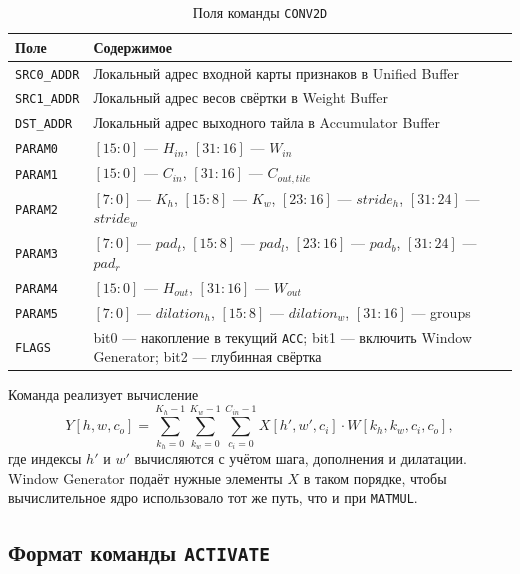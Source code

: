 \documentclass[12pt,a4paper]{article}
\begin{document}
\begin{table}[H]
    \centering
    \caption{Поля команды \texttt{CONV2D}}
    \begin{tabular}{|L{2.6cm}|L{10.1cm}|}
        \hline
        \textbf{Поле} & \textbf{Содержимое} \\
        \hline
        \texttt{SRC0\_ADDR} & Локальный адрес входной карты признаков в Unified Buffer \\
        \hline
        \texttt{SRC1\_ADDR} & Локальный адрес весов свёртки в Weight Buffer \\
        \hline
        \texttt{DST\_ADDR} & Локальный адрес выходного тайла в Accumulator Buffer \\
        \hline
        \texttt{PARAM0} & \([15:0]\) --- \(H_{in}\), \([31:16]\) --- \(W_{in}\) \\
        \hline
        \texttt{PARAM1} & \([15:0]\) --- \(C_{in}\), \([31:16]\) --- \(C_{out, tile}\) \\
        \hline
        \texttt{PARAM2} & \([7:0]\) --- \(K_h\), \([15:8]\) --- \(K_w\), \([23:16]\) --- \(stride_h\), \([31:24]\) --- \(stride_w\) \\
        \hline
        \texttt{PARAM3} & \([7:0]\) --- \(pad_t\), \([15:8]\) --- \(pad_l\), \([23:16]\) --- \(pad_b\), \([31:24]\) --- \(pad_r\) \\
        \hline
        \texttt{PARAM4} & \([15:0]\) --- \(H_{out}\), \([31:16]\) --- \(W_{out}\) \\
        \hline
        \texttt{PARAM5} & \([7:0]\) --- \(dilation_h\), \([15:8]\) --- \(dilation_w\), \([31:16]\) --- groups \\
        \hline
        \texttt{FLAGS} & bit0 --- накопление в текущий \texttt{ACC}; bit1 --- включить Window Generator; bit2 --- глубинная свёртка \\
        \hline
    \end{tabular}
\end{table}

Команда реализует вычисление
\[
Y[h,w,c_o] = \sum_{k_h=0}^{K_h-1} \sum_{k_w=0}^{K_w-1} \sum_{c_i=0}^{C_{in}-1}
X[h',w',c_i] \cdot W[k_h,k_w,c_i,c_o],
\]
где индексы \(h'\) и \(w'\) вычисляются с учётом шага, дополнения и дилатации. Window Generator подаёт нужные элементы \(X\) в таком порядке, чтобы вычислительное ядро использовало тот же путь, что и при \texttt{MATMUL}.

\subsection{Формат команды \texttt{ACTIVATE}}
\end{document}
